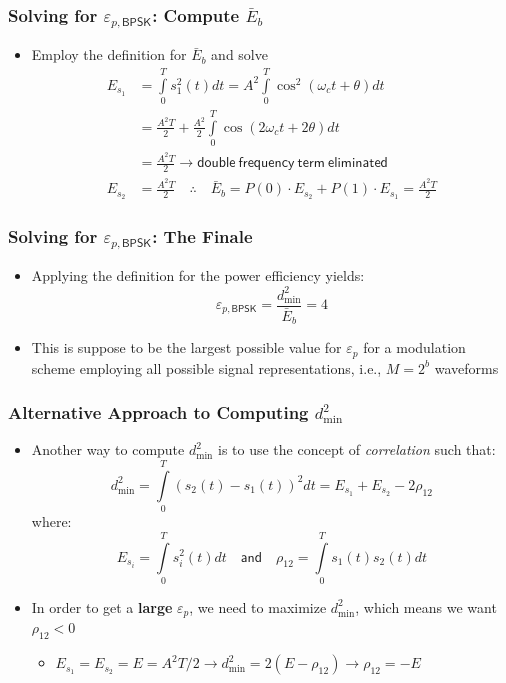 \documentclass[10pt]{beamer}
\begin{document}
\frame
{
  \frametitle{Solving for $\varepsilon_{p,\mathsf{BPSK}}$: Compute $\bar{E}_{b}$}

   \begin{itemize}
   \item Employ the definition for $\bar{E}_{b}$ and solve
    \begin{equation}
    \begin{split}
        E_{s_1}&=\int\limits_0^Ts_1^2(t)dt=A^2\int\limits_0^T\cos^2(\omega_ct+\theta)dt\\
        &=\frac{A^2T}{2}+\frac{A^2}{2}\int\limits_{0}^{T}\cos(2\omega_ct+2\theta)dt\\
        &=\frac{A^2T}{2}\rightarrow\mathsf{double~frequency~term~eliminated}\\
        E_{s_2}&=\frac{A^2T}{2}\quad\therefore\quad\bar{E}_b=P(0)\cdot{E_{s_2}}+P(1)\cdot{E_{s_1}}=\frac{A^2T}{2}\nonumber
    \end{split}
    \end{equation}
    \end{itemize}
}


\frame
{
  \frametitle{Solving for $\varepsilon_{p,\mathsf{BPSK}}$: The Finale}

    \begin{itemize}
        \item Applying the definition for the power efficiency yields:
        \begin{equation}
            \varepsilon_{p,\mathsf{BPSK}} = \frac{d_{\min}^2}{\bar{E}_{b}}=4
        \end{equation}
        \item This is suppose to be the largest possible value for $\varepsilon_{p}$ for a modulation scheme employing all possible signal representations, i.e., $M=2^b$ waveforms
    \end{itemize}
}

\frame
{
  \frametitle{Alternative Approach to Computing $d_{\min}^2$}

  \begin{itemize}
        \item Another way to compute $d_{\min}^2$ is to use the concept of {\it correlation} such that:
        \begin{equation}
            d_{\min}^2=\int\limits_{0}^{T}(s_2(t)-s_1(t))^2dt=E_{s_1}+E_{s_2}-2\rho_{12}
        \end{equation}
        where:
        \begin{equation}
            E_{s_i}=\int\limits_{0}^{T}s_i^2(t)dt\quad\mathsf{and}\quad\rho_{12}=\int\limits_{0}^{T}s_1(t)s_2(t)dt\nonumber
        \end{equation}
        \item In order to get a {\bf large} $\varepsilon_{p}$, we need to maximize $d_{\min}^2$, which means we want $\rho_{12}<0$
        \begin{itemize}
            \item $E_{s_1}=E_{s_2}=E=A^2T/2\rightarrow{d_{\min}^2}=2(E-\rho_{12})\rightarrow{\rho_{12}=-E}$
        \end{itemize}
  \end{itemize}

}
\end{document}
